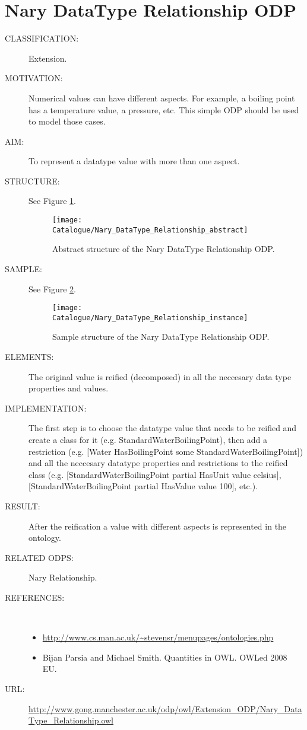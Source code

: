  \section{Nary DataType Relationship ODP}\begin{description}
\item [CLASSIFICATION:] Extension.

\item [MOTIVATION:] Numerical values can have different aspects. For example, a boiling point has a temperature value, a pressure, etc. This simple ODP should be used to model those cases.

\item [AIM:] To represent a datatype value with more than one aspect.

\item [STRUCTURE:] See Figure \ref{odp:Nary_DataType_Relationship_abstract}.
\begin{figure}[]\centering\texttt{[image: Catalogue/Nary\_DataType\_Relationship\_abstract]}\caption{\label{odp:Nary_DataType_Relationship_abstract} Abstract structure of the Nary DataType Relationship ODP.}\end{figure}

\item [SAMPLE:] See Figure \ref{odp:Nary_DataType_Relationship_instance}.
\begin{figure}[]\centering\texttt{[image: Catalogue/Nary\_DataType\_Relationship\_instance]}\caption{\label{odp:Nary_DataType_Relationship_instance} Sample structure of the Nary DataType Relationship ODP.}\end{figure}

\item [ELEMENTS:] The original value is reified (decomposed) in all the neccesary data type properties and values.

\item [IMPLEMENTATION:] The first step is to choose the datatype value that needs to be reified and create a class for it (e.g. StandardWaterBoilingPoint), then add a restriction (e.g. [Water HasBoilingPoint some StandardWaterBoilingPoint]) and all the neccesary datatype properties and restrictions to the reified class (e.g. [StandardWaterBoilingPoint partial HasUnit value celsius], [StandardWaterBoilingPoint partial  HasValue value 100], etc.).

\item [RESULT:] After the reification a value with different aspects is represented in the ontology.

\item [RELATED ODPS:] Nary Relationship.

\item [REFERENCES: ] ~\begin{itemize}
\item \url{http://www.cs.man.ac.uk/~stevensr/menupages/ontologies.php}
\item Bijan Parsia and Michael Smith. Quantities in OWL. OWLed 2008 EU.\end{itemize}
\item [URL: ] \url{http://www.gong.manchester.ac.uk/odp/owl/Extension_ODP/Nary_DataType_Relationship.owl} \end{description}